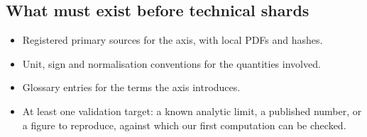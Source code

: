 \subsection*{What must exist before technical shards}

\begin{itemize}
  \item Registered primary sources for the axis, with local PDFs and hashes.
  \item Unit, sign and normalisation conventions for the quantities involved.
  \item Glossary entries for the terms the axis introduces.
  \item At least one validation target: a known analytic limit, a published number, or a figure to
        reproduce, against which our first computation can be checked.
\end{itemize}
